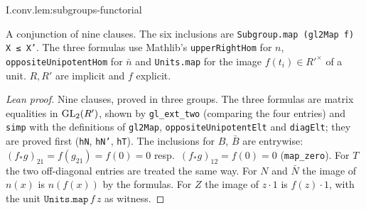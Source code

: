 \begin{lemma}
\end{lemma}
\begin{tfformal}{I.conv.lem:subgroups-functorial}
\begin{tffidelity}
A conjunction of nine clauses. The six inclusions are \texttt{Subgroup.map (gl2Map f) X ≤ X'}. The three formulas use Mathlib's \texttt{upperRightHom} for $n$, \texttt{oppositeUnipotentHom} for $\bar n$ and \texttt{Units.map} for the image $f(t_i)\in R'^\times$ of a unit. $R,R'$ are implicit and $f$ explicit.
\end{tffidelity}
\end{tfformal}
\begin{proof}[Lean proof]
Nine clauses, proved in three groups. The three formulas are matrix equalities in $\mathrm{GL}_2(R')$, shown by \texttt{gl\_ext\_two} (comparing the four entries) and \texttt{simp} with the definitions of \texttt{gl2Map}, \texttt{oppositeUnipotentElt} and \texttt{diagElt}; they are proved first (\texttt{hN}, \texttt{hN'}, \texttt{hT}). The inclusions for $B$, $\bar B$ are entrywise: $(f_*g)_{21}=f(g_{21})=f(0)=0$ resp.\ $(f_*g)_{12}=f(0)=0$ (\texttt{map\_zero}). For $T$ the two off-diagonal entries are treated the same way. For $N$ and $\bar N$ the image of $n(x)$ is $n(f(x))$ by the formulas. For $Z$ the image of $z\cdot1$ is $f(z)\cdot1$, with the unit $\texttt{Units.map}\,f\,z$ as witness.
\end{proof}

